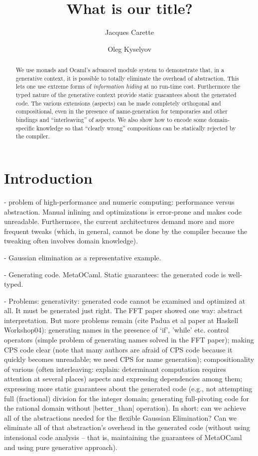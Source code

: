 \documentclass[11pt]{llncs}
\begin{document}
\title{What is our title?}
\author{ Jacques Carette
 \and
 Oleg Kyselyov
}


\maketitle


\begin{abstract}
We use monads and Ocaml's advanced module system to
demonstrate that, in a generative context, it is
possible to totally eliminate the overhead of abstraction.
This lets one use extreme forms of \textit{information hiding}
at no run-time cost. Furthermore the typed nature of
the generative context provide static guarantees about the
generated code. The various extensions
(aspects) can be made completely orthogonal and compositional,
even in the presence of name-generation for temporaries and
other bindings and ``interleaving'' of aspects. We also
show how to encode some domain-specific knowledge so that
``clearly wrong'' compositions can be statically rejected by the
compiler.
\end{abstract}

\section{Introduction}

- problem of high-performance and numeric computing:
performance versus abstraction. Manual inlining and optimizations is
error-prone and makes code unreadable. Furthermore, the current
architectures demand more and more frequent tweaks (which, in general,
cannot be done by the compiler because the tweaking often involves domain
knowledge).

- Gaussian elimination as a representative example.

- Generating code. MetaOCaml. Static guarantees: the generated
code is well-typed.

- Problems: generativity: generated code cannot be examined
and optimized at all. It must be generated just right. The FFT paper
showed one way: abstract interpretation. But more problems remain
(cite Padua et al paper at Haskell Workshop04): generating names in
the presence of `if', 'while' etc. control operators (simple problem
of generating names solved in the FFT paper); making CPS code clear
(note that many authors are afraid of CPS code because it quickly
becomes unreadable; we need CPS for name generation); compositionality
of various (often interleaving: explain: determinant computation
requires attention at several places) aspects and expressing
dependencies among them; expressing more static guarantees about the
generated code (e.g., not attempting full (fractional) division for
the integer domain; generating full-pivoting code for the rational
domain without |better_than| operation). In short: can we achieve all
of the abstractions needed for the flexible Gaussian Elimination? Can
we eliminate all of that abstraction's overhead in the generated code
(without using intensional code analysis -- that is, maintaining the
guarantees of MetaOCaml and using pure generative approach).
\end{document}

